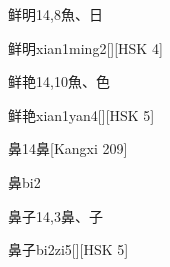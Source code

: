 \begin{entry}{鲜明}{14,8}{⿂、⽇}
  \begin{phonetics}{鲜明}{xian1ming2}[][HSK 4]
  \end{phonetics}
\end{entry}

\begin{entry}{鲜艳}{14,10}{⿂、⾊}
  \begin{phonetics}{鲜艳}{xian1yan4}[][HSK 5]
  \end{phonetics}
\end{entry}

\begin{entry}{鼻}{14}{⿐}[Kangxi 209]
  \begin{phonetics}{鼻}{bi2}
  \end{phonetics}
\end{entry}

\begin{entry}{鼻子}{14,3}{⿐、⼦}
  \begin{phonetics}{鼻子}{bi2zi5}[][HSK 5]
  \end{phonetics}
\end{entry}


